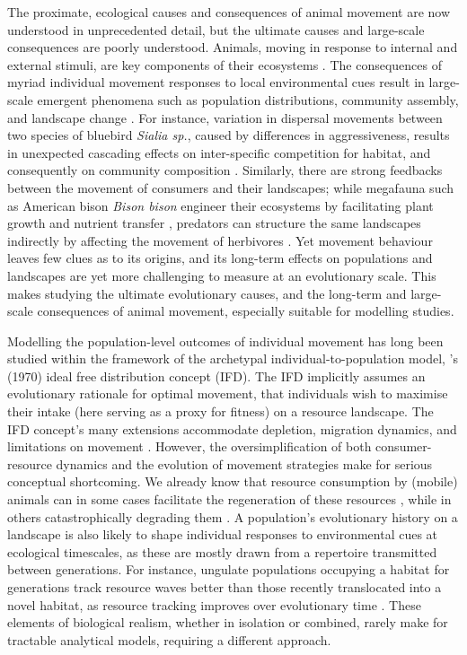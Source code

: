 \documentclass[11pt]{article}
\begin{document}
The proximate, ecological causes and consequences of animal movement are now understood in unprecedented detail, but the ultimate causes and large-scale consequences are poorly understood.
Animals, moving in response to internal and external stimuli, are key components of their ecosystems \citep{nathan2008,jeltsch2013}.
The consequences of myriad individual movement responses to local environmental cues result in large-scale emergent phenomena such as population distributions, community assembly, and landscape change \citep{jeltsch2013,schlagel2020}.
For instance, variation in dispersal movements between two species of bluebird \textit{Sialia sp.}, caused by differences in aggressiveness, results in unexpected cascading effects on inter-specific competition for habitat, and consequently on community composition \citep{duckworth2007}.
Similarly, there are strong feedbacks between the movement of consumers and their landscapes; while megafauna such as American bison \textit{Bison bison} engineer their ecosystems by facilitating plant growth and nutrient transfer \citep[][]{geremia2019,geremia2020,leroux2018}, predators can structure the same landscapes indirectly by affecting the movement of herbivores \citep[the landscape of fear;][]{leroux2018,kohl2018,brown1999}.
Yet movement behaviour leaves few clues as to its origins, and its long-term effects on populations and landscapes are yet more challenging to measure at an evolutionary scale.
This makes studying the ultimate evolutionary causes, and the long-term and large-scale consequences of animal movement, especially suitable for modelling studies.

Modelling the population-level outcomes of individual movement has long been studied within the framework of the archetypal individual-to-population model, \citeauthor{fretwell1970}'s (1970) ideal free distribution concept (IFD).
The IFD implicitly assumes an evolutionary rationale for optimal movement, that individuals wish to maximise their intake (here serving as a proxy for fitness) on a resource landscape.
The IFD concept's many extensions accommodate depletion, migration dynamics, and limitations on movement \citep[][]{tregenza1995,bernstein1988,cressman2006,meer1997,matsumura2010}.
However, the oversimplification of both consumer-resource dynamics and the evolution of movement strategies \citep[e.g.][]{cressman2006} make for serious conceptual shortcoming.
We already know that resource consumption by (mobile) animals can in some cases facilitate the regeneration of these resources \citep[][; see also \citealt{kotanen2013}]{geremia2019,leroux2018}, while in others catastrophically degrading them \citep{siero2019,koppel2008,dekoppel1997,kotanen2013}.
A population's evolutionary history on a landscape is also likely to shape individual responses to environmental cues at ecological timescales, as these are mostly drawn from a repertoire transmitted between generations.
For instance, ungulate populations occupying a habitat for generations track resource waves better than those recently translocated into a novel habitat, as resource tracking improves over evolutionary time \citep[][]{jesmer2018}.
These elements of biological realism, whether in isolation or combined, rarely make for tractable analytical models, requiring a different approach.
\end{document}
